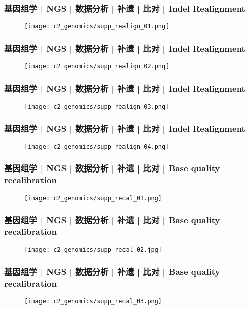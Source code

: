 \begin{frame}
  \frametitle{基因组学 | NGS | 数据分析 | 补遗 | 比对 | Indel Realignment}
  \begin{figure}
    \centering
    \texttt{[image: c2\_genomics/supp\_realign\_01.png]}
  \end{figure}
\end{frame}

\begin{frame}
  \frametitle{基因组学 | NGS | 数据分析 | 补遗 | 比对 | Indel Realignment}
  \begin{figure}
    \centering
    \texttt{[image: c2\_genomics/supp\_realign\_02.png]}
  \end{figure}
\end{frame}

\begin{frame}
  \frametitle{基因组学 | NGS | 数据分析 | 补遗 | 比对 | Indel Realignment}
  \begin{figure}
    \centering
    \texttt{[image: c2\_genomics/supp\_realign\_03.png]}
  \end{figure}
\end{frame}

\begin{frame}
  \frametitle{基因组学 | NGS | 数据分析 | 补遗 | 比对 | Indel Realignment}
  \begin{figure}
    \centering
    \texttt{[image: c2\_genomics/supp\_realign\_04.png]}
  \end{figure}
\end{frame}

\begin{frame}
  \frametitle{基因组学 | NGS | 数据分析 | 补遗 | 比对 | Base quality recalibration}
  \begin{figure}
    \centering
    \texttt{[image: c2\_genomics/supp\_recal\_01.png]}
  \end{figure}
\end{frame}

\begin{frame}
  \frametitle{基因组学 | NGS | 数据分析 | 补遗 | 比对 | Base quality recalibration}
  \begin{figure}
    \centering
    \texttt{[image: c2\_genomics/supp\_recal\_02.jpg]}
  \end{figure}
\end{frame}

\begin{frame}
  \frametitle{基因组学 | NGS | 数据分析 | 补遗 | 比对 | Base quality recalibration}
  \begin{figure}
    \centering
    \texttt{[image: c2\_genomics/supp\_recal\_03.png]}
  \end{figure}
\end{frame}

